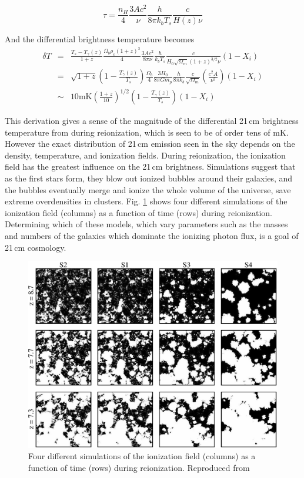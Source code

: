 {\begin{equation}
\tau=\frac{n_H}{4}\frac{3Ac^2}{\nu}\frac{h}{8\pi k_bT_s}\frac{c}{H(z)\nu}
\end{equation}

And the differential brightness temperature becomes
\begin{eqnarray}
\delta T&=&\frac{T_s-T_\gamma(z)}{1+z}\frac{\Omega_b\rho_c(1+z)^3}{4}\frac{3Ac^2}{8\pi\nu}\frac{h}{k_bT_s}\frac{c}{H_0\sqrt{\Omega_m}(1+z)^{3/2}\nu}(1-X_i)\\
&=&\sqrt{1+z}\left(1-\frac{T_\gamma(z)}{T_s}\right)\frac{\Omega_b}{4}\frac{3H_0}{8\pi Gm_p}\frac{h}{8\pi k_b}\frac{c}  {\sqrt{\Omega_m}}\left(\frac{c^2A}{\nu^2}\right)(1-X_i)\\
&\sim &10\text{mK}\left(\frac{1+z}{10}\right)^{1/2}\left(1-\frac{T_\gamma(z)}{T_s}\right)(1-X_i)
\end{eqnarray}

This derivation gives a sense of the magnitude of the differential 21\,cm brightness temperature from during reionization, which is seen to be of order tens of mK. However the exact distribution of 21\,cm emission seen in the sky depends on the density, temperature, and ionization fields. During reionization, the ionization field has the greatest influence on the 21\,cm brightness. Simulations suggest that as the first stars form, they blow out ionized bubbles around their galaxies, and the bubbles eventually merge and ionize the whole volume of the universe, save extreme overdensities in clusters. Fig. \ref{fig:mcquinneorsims} shows four different simulations of the ionization field (columns) as a function of time (rows) during reionization. Determining which of these models, which vary parameters such as the masses and numbers of the galaxies which dominate the ionizing photon flux, is a goal of 21\,cm cosmology.

\begin{figure}
	\centering
	\includegraphics[width=6in]{chap0_intro/mcquinn_ionized_region_sims.eps}
	\caption[Four different simulations of the ionization field as a function of time.]{Four different simulations of the ionization field (columns) as a function of time (rows) during reionization. Reproduced from \citet{McQuinn06}}
	\label{fig:mcquinneorsims}
\end{figure}



}
